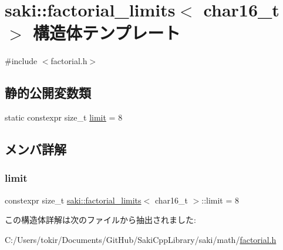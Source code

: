 \hypertarget{structsaki_1_1factorial__limits_3_01char16__t_01_4}{}\section{saki\+:\+:factorial\+\_\+limits$<$ char16\+\_\+t $>$ 構造体テンプレート}
\label{structsaki_1_1factorial__limits_3_01char16__t_01_4}


{\ttfamily \#include $<$factorial.\+h$>$}

\subsection*{静的公開変数類}
\begin{DoxyCompactItemize}
\item 
static constexpr size\+\_\+t \mbox{\hyperlink{structsaki_1_1factorial__limits_3_01char16__t_01_4_af4a2c0b88c47eaa4a9a7abda01d3d8f2}{limit}} = 8
\end{DoxyCompactItemize}


\subsection{メンバ詳解}
\mbox{\label{structsaki_1_1factorial__limits_3_01char16__t_01_4_af4a2c0b88c47eaa4a9a7abda01d3d8f2}} 
\subsubsection{\texorpdfstring{limit}{limit}}
{\footnotesize\ttfamily constexpr size\+\_\+t \mbox{\hyperlink{structsaki_1_1factorial__limits}{saki\+::factorial\+\_\+limits}}$<$ char16\+\_\+t $>$\+::limit = 8\hspace{0.3cm}{\ttfamily [static]}}



この構造体詳解は次のファイルから抽出されました\+:\begin{DoxyCompactItemize}
\item 
C\+:/\+Users/tokir/\+Documents/\+Git\+Hub/\+Saki\+Cpp\+Library/saki/math/\mbox{\hyperlink{factorial_8h}{factorial.\+h}}\end{DoxyCompactItemize}
